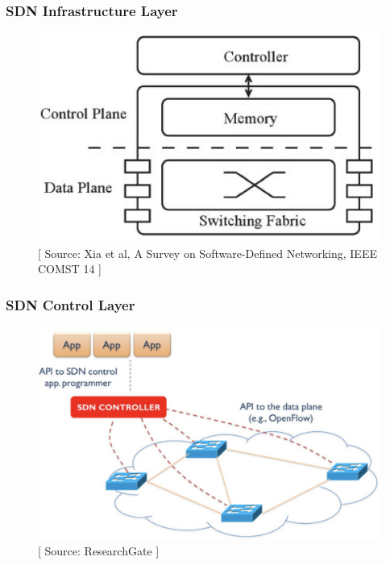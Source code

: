 \documentclass{beamer}
\begin{document}
\begin{frame}
  \frametitle{SDN Infrastructure Layer}
  \begin{figure}
    \begin{center}
      \includegraphics[scale=0.3]{images/sdn-11}
    \end{center}
    \vspace{0.5cm}
    \caption{\small{[ Source: Xia et al, A Survey on Software-Defined Networking, IEEE COMST 14 ]}}
  \end{figure}
\end{frame}
\begin{frame}
  \frametitle{SDN Control Layer}
  \begin{figure}
    \begin{center}
      \includegraphics[scale=0.5]{images/sdn-12}
    \end{center}
    \caption{\small{[ Source: ResearchGate ]}}
  \end{figure}
\end{frame}
\end{document}
